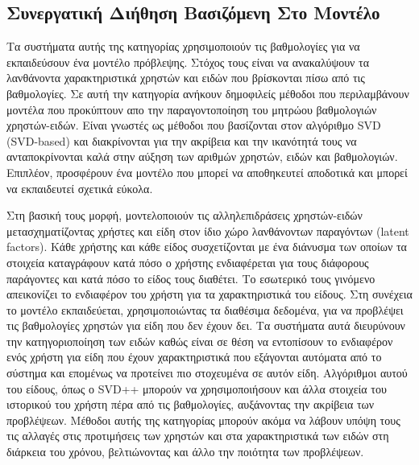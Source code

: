 \subsection{Συνεργατική Διήθηση Βασιζόμενη Στο Μοντέλο}
Τα συστήματα αυτής της κατηγορίας χρησιμοποιούν τις βαθμολογίες για να εκπαιδεύσουν ένα μοντέλο πρόβλεψης. Στόχος τους είναι να ανακαλύψουν τα λανθάνοντα χαρακτηριστικά χρηστών και ειδών που βρίσκονται πίσω από τις βαθμολογίες. Σε αυτή την κατηγορία ανήκουν δημοφιλείς μέθοδοι που περιλαμβάνουν μοντέλα που προκύπτουν απο την παραγοντοποίηση του μητρώου βαθμολογιών χρηστών-ειδών. Είναι γνωστές ως μέθοδοι που βασίζονται στον αλγόριθμο {\en SVD (SVD-based)} και διακρίνονται για την ακρίβεια και την ικανότητά τους να ανταποκρίνονται καλά στην αύξηση των αριθμών χρηστών, ειδών και βαθμολογιών. Επιπλέον, προσφέρουν ένα μοντέλο που μπορεί να αποθηκευτεί αποδοτικά και μπορεί να εκπαιδευτεί σχετικά εύκολα. \par
Στη βασική τους μορφή, μοντελοποιούν τις αλληλεπιδράσεις χρηστών-ειδών μετασχηματίζοντας χρήστες και είδη στον ίδιο χώρο λανθάνοντων παραγόντων {(\en latent factors)}. Kάθε χρήστης και κάθε είδος συσχετίζονται με ένα διάνυσμα των οποίων τα στοιχεία καταγράφουν κατά πόσο ο χρήστης ενδιαφέρεται για τους διάφορους παράγοντες και κατά πόσο το είδος τους διαθέτει. Το εσωτερικό τους γινόμενο απεικονίζει το ενδιαφέρον του χρήστη για τα χαρακτηριστικά του είδους. Στη συνέχεια το μοντέλο εκπαιδεύεται, χρησιμοποιώντας τα διαθέσιμα δεδομένα, για να προβλέψει τις βαθμολογίες χρηστών για είδη που δεν έχουν δει. Τα συστήματα αυτά διευρύνουν την κατηγοριοποίηση των ειδών καθώς είναι σε θέση να εντοπίσουν το ενδιαφέρον ενός χρήστη για είδη που έχουν χαρακτηριστικά που εξάγονται αυτόματα από το σύστημα και επομένως να προτείνει πιο στοχευμένα σε αυτόν είδη. Αλγόριθμοι αυτού του είδους, όπως ο {\en SVD++} \cite{Koren:2008:FMN:1401890.1401944} μπορούν να χρησιμοποιήσουν και άλλα στοιχεία του ιστορικού του χρήστη πέρα από τις βαθμολογίες, αυξάνοντας την ακρίβεια των προβλέψεων. Μέθοδοι αυτής της κατηγορίας μπορούν ακόμα να λάβουν υπόψη τους τις αλλαγές στις προτιμήσεις των χρηστών και στα χαρακτηριστικά των ειδών στη διάρκεια του χρόνου, βελτιώνοντας και άλλο την ποιότητα των προβλέψεων. \cite{ricci2011recommender}
